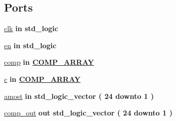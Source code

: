 \subsection*{Ports}
 \begin{DoxyCompactItemize}
\item 
\hyperlink{classcomparadores_a4a4609c199d30b3adebbeb3a01276ec5}{clk}  {\bfseries {\bfseries \textcolor{keywordflow}{in}\textcolor{vhdlchar}{ }}} {\bfseries \textcolor{comment}{std\+\_\+logic}\textcolor{vhdlchar}{ }} 
\item 
\hyperlink{classcomparadores_adcf9c6f5161d039addbda5819bee64a3}{en}  {\bfseries {\bfseries \textcolor{keywordflow}{in}\textcolor{vhdlchar}{ }}} {\bfseries \textcolor{comment}{std\+\_\+logic}\textcolor{vhdlchar}{ }} 
\item 
\hyperlink{classcomparadores_ab73cec596619a058f732a10e71d5aada}{comp}  {\bfseries {\bfseries \textcolor{keywordflow}{in}\textcolor{vhdlchar}{ }}} {\bfseries {\bfseries \hyperlink{classmy__types__pkg_ae9b90869e95e036baa1ead1b6238589a}{C\+O\+M\+P\+\_\+\+A\+R\+R\+A\+Y}} \textcolor{vhdlchar}{ }} 
\item 
\hyperlink{classcomparadores_ab52608f377848fc687beeb76bb39a6e8}{c}  {\bfseries {\bfseries \textcolor{keywordflow}{in}\textcolor{vhdlchar}{ }}} {\bfseries {\bfseries \hyperlink{classmy__types__pkg_ae9b90869e95e036baa1ead1b6238589a}{C\+O\+M\+P\+\_\+\+A\+R\+R\+A\+Y}} \textcolor{vhdlchar}{ }} 
\item 
\hyperlink{classcomparadores_a0d7d8d086cf18e0180f8c280d76ed624}{amost}  {\bfseries {\bfseries \textcolor{keywordflow}{in}\textcolor{vhdlchar}{ }}} {\bfseries \textcolor{comment}{std\+\_\+logic\+\_\+vector}\textcolor{vhdlchar}{ }\textcolor{vhdlchar}{(}\textcolor{vhdlchar}{ }\textcolor{vhdlchar}{ } \textcolor{vhdldigit}{24} \textcolor{vhdlchar}{ }\textcolor{keywordflow}{downto}\textcolor{vhdlchar}{ }\textcolor{vhdlchar}{ } \textcolor{vhdldigit}{1} \textcolor{vhdlchar}{ }\textcolor{vhdlchar}{)}\textcolor{vhdlchar}{ }} 
\item 
\hyperlink{classcomparadores_a8d13d6e22531ac75ac0b437c61c6eb4f}{comp\+\_\+out}  {\bfseries {\bfseries \textcolor{keywordflow}{out}\textcolor{vhdlchar}{ }}} {\bfseries \textcolor{comment}{std\+\_\+logic\+\_\+vector}\textcolor{vhdlchar}{ }\textcolor{vhdlchar}{(}\textcolor{vhdlchar}{ }\textcolor{vhdlchar}{ } \textcolor{vhdldigit}{24} \textcolor{vhdlchar}{ }\textcolor{keywordflow}{downto}\textcolor{vhdlchar}{ }\textcolor{vhdlchar}{ } \textcolor{vhdldigit}{1} \textcolor{vhdlchar}{ }\textcolor{vhdlchar}{)}\textcolor{vhdlchar}{ }} 
\end{DoxyCompactItemize}


